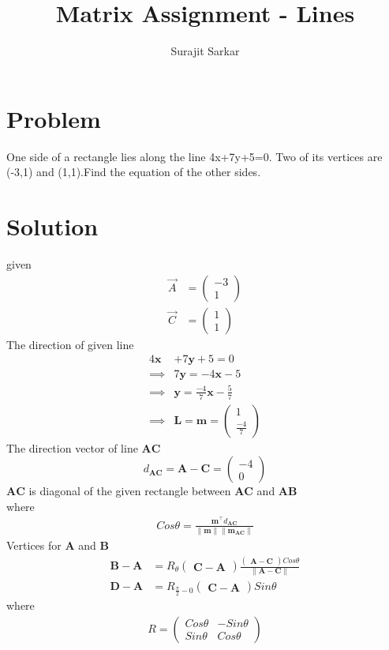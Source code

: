 \documentclass[journal,12pt,twocolumn]{IEEEtran}
\title{\mytitle}
\title{
Matrix Assignment - Lines
}
\author{Surajit Sarkar}
\newcommand{\myvec}[1]{\ensuremath{\begin{pmatrix}#1\end{pmatrix}}}
\let\vec\mathbf
\begin{document}
\maketitle
\tableofcontents
\bigskip


\section{\textbf{Problem}}
One side of a rectangle lies along the line 4x+7y+5=0.
Two of its vertices are (-3,1) and (1,1).Find the equation of the other sides.


\section{\textbf{Solution}}
given
\begin{align}
     \Vec{A}&=\myvec{-3\\1}\\
     \Vec{C}&=\myvec{1\\1}
\end{align}
The direction of given line
\begin{align}
  4\vec{x}&+7\vec{y}+5=0\\
  \implies& 7\vec{y}=-4\vec{x}-5\\
  \implies& \vec{y}=\frac{-4}{7}\vec{x}-\frac{5}{7}\\
   \implies&\vec{L}=\vec{m}=\myvec{1\\{\frac{-4}{7}}}
\end{align}
The direction vector of line $\vec{AC}$ 
\begin{equation}
    d_{\vec{AC}}=\vec{A}-\vec{C}=\myvec{-4\\0}
\end{equation}
$\vec{AC}$ is diagonal of the given rectangle between $\vec{AC}$ and $\vec{AB}$
\\

where
\\
\begin{align}
    Cos\theta={\frac{\vec{m}^{\top}d_{\vec{AC}}}{\|\vec{m}\|\|\vec {m}_{\vec{AC}}\|}}
\end{align}
Vertices for $\vec{A}$ and $\vec{B}$
\begin{align}
    \vec{B}-\vec{A}&=R_{\theta}{\myvec{\vec{C}-\vec{A}}} {\frac{\myvec{\vec{A}-\vec{C}}Cos\theta}{\|\vec{A}-\vec{C}\|}}\\
    \vec{D}-\vec{A}&=R_{\frac{\pi}{2}-0}\myvec{\vec{C}-\vec{A}} Sin\theta
\end{align}
where
\begin{align}
    R=\myvec{Cos\theta&-Sin\theta\\Sin\theta&Cos\theta}
\end{align}
\\
\end{document}
